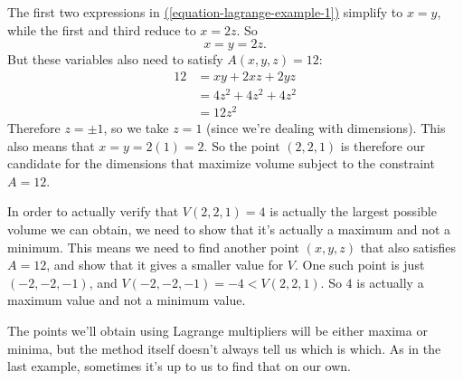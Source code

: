 \documentclass[10pt,]{book}
\theoremstyle{ptxplainnotitle}
\theoremstyle{ptxplaintitle}
\theoremstyle{ptxplainnotitle}
\theoremstyle{ptxplaintitle}
\theoremstyle{ptxplainnotitle}
\theoremstyle{ptxplaintitle}
\theoremstyle{ptxdefinitionnotitle}
\theoremstyle{ptxdefinitiontitle}
\theoremstyle{ptxdefinitionnotitle}
\theoremstyle{ptxdefinitiontitle}
\theoremstyle{ptxdefinitionnotitle}
\theoremstyle{ptxdefinitiontitle}
\theoremstyle{ptxdefinitionnotitle}
\theoremstyle{ptxdefinitiontitle}
\theoremstyle{ptxdefinitionnotitle}
\theoremstyle{ptxdefinitiontitle}
\numberwithin{equation}{section}
\begin{document}
\begin{example}
\begin{equation}
\end{equation}
%
\par
\hypertarget{p-1102}{}%
The first two expressions in \hyperref[equation-lagrange-example-1]{(\ref{equation-lagrange-example-1})} simplify to \(x=y\), while the first and third reduce to \(x = 2z\). So%
\begin{equation*}
x = y = 2z\text{.}
\end{equation*}
But these variables also need to satisfy \(A(x,y,z) = 12\):%
\begin{align*}
12 & = xy + 2xz + 2yz \\
& = 4z^{2} + 4z^{2} + 4z^{2} \\
& = 12z^{2} 
\end{align*}
Therefore \(z = \pm1\), so we take \(z=1\) (since we're dealing with dimensions). This also means that \(x = y = 2(1) = 2\). So the point \((2,2,1)\) is therefore our candidate for the dimensions that maximize volume subject to the constraint \(A = 12\).%
\par
\hypertarget{p-1103}{}%
In order to actually verify that \(V(2,2,1) = 4\) is actually the largest possible volume we can obtain, we need to show that it's actually a maximum and not a minimum. This means we need to find another point \((x,y,z)\) that also satisfies \(A = 12\), and show that it gives a smaller value for \(V\). One such point is just \((-2,-2,-1)\), and \(V(-2,-2,-1) = -4 < V(2,2,1)\). So \(4\) is actually a maximum value and not a minimum value.%
\end{example}
\hypertarget{p-1104}{}%
The points we'll obtain using Lagrange multipliers will be either maxima or minima, but the method itself doesn't always tell us which is which. As in the last example, sometimes it's up to us to find that on our own.%
\end{document}
